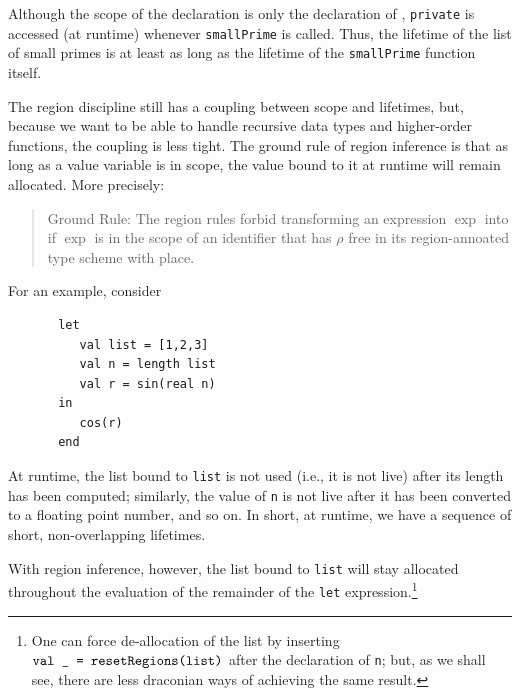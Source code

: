 \documentclass[12pt]{book}
\begin{document}
Although the scope of the declaration is only the declaration of ,
{\tt private} is accessed (at runtime) whenever {\tt smallPrime} is called.
Thus, the lifetime of the list of small primes is at least as long as the
lifetime of the {\tt smallPrime} function itself.

The region discipline still has a coupling between scope and lifetimes,
but, because we want to be able to handle recursive data types and higher-order
functions, the coupling is less tight. 
The ground rule of region inference
%
%
is that as long as a value variable is in scope, the value bound to it
at runtime will remain allocated. More precisely:
\begin{quote}
  Ground Rule: The region rules forbid transforming an expression
  $\exp$ into  if $\exp$ is in
  the scope of an identifier that has $\rho$ free in its
  region-annoated type scheme with place.
\end{quote}
For an example, consider
\begin{verbatim}
       let 
          val list = [1,2,3]
          val n = length list
          val r = sin(real n)
       in
          cos(r)
       end
\end{verbatim} 
At runtime, the list bound to {\tt list} is not used (i.e., it is not live) 
after its length has been computed;
similarly, the value of {\tt n} is not live after it has been converted to a floating point
number, and so on. In short, at runtime, we have a sequence of short, non-overlapping
lifetimes. 

With region inference, however, the list bound to {\tt list} will stay allocated
throughout the evaluation of the remainder of the {\tt let} expression.\footnote{One can
force de-allocation of the list by  inserting 
$\hbox{\tt val \_ = \hbox{\tt resetRegions}(list)}$ after the declaration of {\tt n}; but, as we shall see,
there are less draconian ways of achieving the same result.} 
\end{document}

